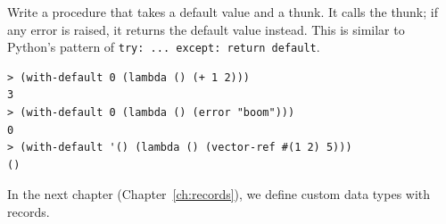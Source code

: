 \begin{exercise}
Write a  procedure that takes a default value and a thunk. It calls the thunk; if any error is raised, it returns the default value instead. This is similar to Python's pattern of \texttt{try: ... except: return default}.

\begin{lstlisting}[style=repl]
> (with-default 0 (lambda () (+ 1 2)))
3
> (with-default 0 (lambda () (error "boom")))
0
> (with-default '() (lambda () (vector-ref #(1 2) 5)))
()
\end{lstlisting}
\end{exercise}

In the next chapter (Chapter~\ref{ch:records}), we define custom data types with records.

\chapterend
